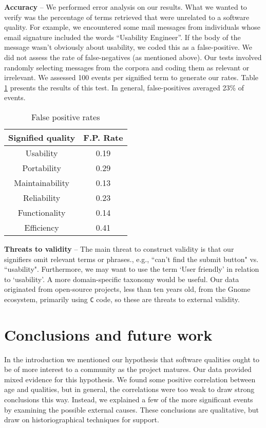 \documentclass[conference, compsoc]{IEEEtran}
\begin{document}
\noindent\textbf{Accuracy} -- We performed error analysis on our results. What we wanted to verify was the percentage of terms retrieved that were unrelated to a software quality. For example, we encountered some mail messages from individuals whose email signature included the words ``Usability Engineer''. If the body of the message wasn't obviously about usability, we coded this as a false-positive. We did not assess the rate of false-negatives (as mentioned above). Our tests involved randomly selecting messages from the corpora and coding them as relevant or irrelevant. We assessed 100 events per signified term to generate our rates. Table \ref{tbl:error} presents the results of this test. In general, false-positives averaged 23\% of events.

\begin{table}
	\caption{False positive rates}
	\centering
	\label{tbl:error}
\begin{tabular}{|c|c|}
\hline
Signified quality & F.P. Rate  \\
\hline
\hline
Usability & 0.19\\ \hline
Portability & 0.29\\ \hline
Maintainability & 0.13\\ \hline
Reliability & 0.23\\ \hline
Functionality & 0.14 \\ \hline
Efficiency & 0.41\\ \hline
\hline
\end{tabular}
\end{table}

\noindent\textbf{Threats to validity} -- The main threat to construct validity is that our signifiers omit relevant terms or phrases., e.g., ``can't find the submit button" vs. ``usability". Furthermore, we may want to use the term `User friendly' in relation to `usability'. A more domain-specific taxonomy would be useful. Our data originated from open-source projects, less than ten years old, from the Gnome ecosystem, primarily using \texttt{C} code, so these are threats to external validity.

\vspace{-2mm}
\section{Conclusions and future work}
\vspace{-2mm}
In the introduction we mentioned our hypothesis that software qualities ought to be of more interest to a community as the project matures. Our data provided mixed evidence for this hypothesis. We found some positive correlation between age and qualities, but in general, the correlations were too weak to draw strong conclusions this way. Instead, we explained a few of the more significant events by examining the possible external causes. These conclusions are qualitative, but draw on historiographical techniques for support.
\end{document}

